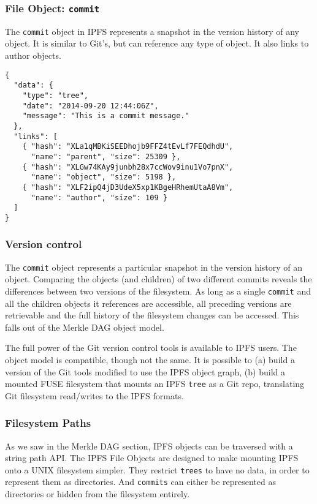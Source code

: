 \documentclass{sig-alternate}
\begin{document}
\subsubsection{File Object: \texttt{commit}}

The \texttt{commit} object in IPFS represents a snapshot in the version history of any object. It is similar to Git's, but can reference any type of object. It also links to author objects.

\begin{verbatim}
{
  "data": {
    "type": "tree",
    "date": "2014-09-20 12:44:06Z",
    "message": "This is a commit message."
  },
  "links": [
    { "hash": "XLa1qMBKiSEEDhojb9FFZ4tEvLf7FEQdhdU",
      "name": "parent", "size": 25309 },
    { "hash": "XLGw74KAy9junbh28x7ccWov9inu1Vo7pnX",
      "name": "object", "size": 5198 },
    { "hash": "XLF2ipQ4jD3UdeX5xp1KBgeHRhemUtaA8Vm",
      "name": "author", "size": 109 }
  ]
}
\end{verbatim}

\subsubsection{Version control}

The \texttt{commit} object represents a particular snapshot in the version
history of an object. Comparing the objects (and children) of two
different commits reveals the differences between two versions of the
filesystem. As long as a single \texttt{commit} and all the children objects
it references are accessible, all preceding versions are retrievable and the
full history of the filesystem changes can be accessed. This falls out
of the Merkle DAG object model.

The full power of the Git version control tools is available to IPFS users. The object model is compatible, though not the same. It is possible to (a) build a version of the Git tools modified to use the IPFS object graph, (b) build a mounted FUSE filesystem that mounts an IPFS \texttt{tree} as a Git repo, translating Git filesystem read/writes to the IPFS formats.


\subsubsection{Filesystem Paths}

As we saw in the Merkle DAG section, IPFS objects can be traversed with a string path API. The IPFS File Objects are designed to make mounting IPFS onto a UNIX filesystem simpler. They restrict \texttt{trees} to have no data, in order to represent them as directories. And \texttt{commits} can either be represented as directories or hidden from the filesystem entirely.
\end{document}
